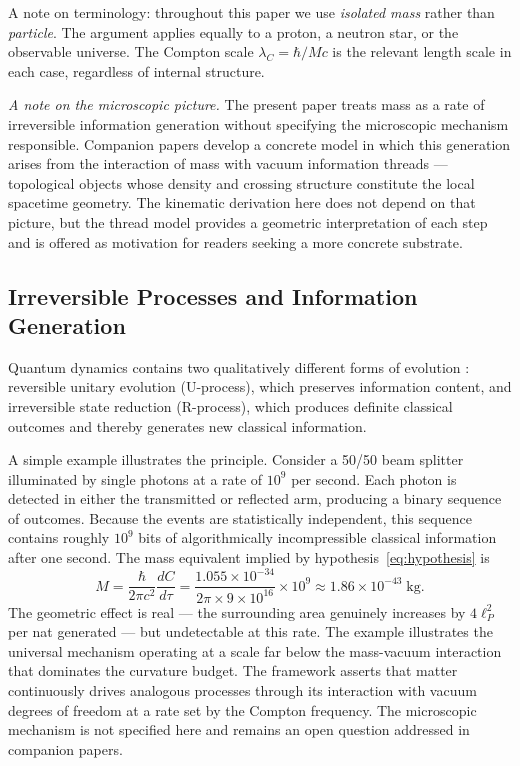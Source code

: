 \documentclass[12pt]{article}
\begin{document}
A note on terminology: throughout this paper we use \emph{isolated mass}
rather than \emph{particle}.
The argument applies equally to a proton, a neutron star, or the
observable universe.
The Compton scale $\lambda_C = \hbar/Mc$ is the relevant length scale
in each case, regardless of internal structure.

\smallskip
\noindent\textit{A note on the microscopic picture.}
The present paper treats mass as a rate of irreversible information
generation without specifying the microscopic mechanism responsible.
Companion papers develop a concrete model in which this generation
arises from the interaction of mass with vacuum information
threads --- topological objects whose density and crossing structure
constitute the local spacetime geometry.
The kinematic derivation here does not depend on that picture, but
the thread model provides a geometric interpretation of each step
and is offered as motivation for readers seeking a more concrete
substrate.

\subsection{Irreversible Processes and Information Generation}
\label{sec:irreversible}

Quantum dynamics contains two qualitatively different forms of
evolution \cite{Penrose1994}: reversible unitary evolution (U-process),
which preserves information content, and irreversible state reduction
(R-process), which produces definite classical outcomes and thereby
generates new classical information.

A simple example illustrates the principle.
Consider a 50/50 beam splitter illuminated by single photons at a rate
of $10^9$ per second.
Each photon is detected in either the transmitted or reflected arm,
producing a binary sequence of outcomes.
Because the events are statistically independent, this sequence contains
roughly $10^9$ bits of algorithmically incompressible classical
information after one second.
The mass equivalent implied by hypothesis~\eqref{eq:hypothesis} is
\begin{equation}
  M = \frac{\hbar}{2\pi c^2}\frac{dC}{d\tau}
    = \frac{1.055\times10^{-34}}{2\pi \times 9\times10^{16}}
      \times 10^9
    \approx 1.86\times10^{-43}\;\text{kg}.
\end{equation}
The geometric effect is real --- the surrounding area genuinely increases
by $4\ell_P^2$ per nat generated --- but undetectable at this rate.
The example illustrates the universal mechanism operating at a scale
far below the mass-vacuum interaction that dominates the curvature budget.
The framework asserts that matter continuously drives analogous processes
through its interaction with vacuum degrees of freedom at a rate set by
the Compton frequency.
The microscopic mechanism is not specified here and remains an open
question addressed in companion papers.
\end{document}
